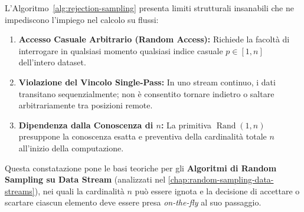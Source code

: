 \begin{property}
L'Algoritmo~\ref{alg:rejection-sampling} presenta limiti strutturali insanabili che ne impediscono l'impiego nel calcolo su flussi:
\begin{enumerate}
  \item \textbf{Accesso Casuale Arbitrario (Random Access):} Richiede la facoltà di interrogare in qualsiasi momento qualsiasi indice casuale $p \in [1, n]$ dell'intero dataset.
  \item \textbf{Violazione del Vincolo Single-Pass:} In uno stream continuo, i dati transitano sequenzialmente; non è consentito tornare indietro o saltare arbitrariamente tra posizioni remote.
  \item \textbf{Dipendenza dalla Conoscenza di $n$:} La primitiva $\operatorname{Rand}(1, n)$ presuppone la conoscenza esatta e preventiva della cardinalità totale $n$ all'inizio della computazione.
\end{enumerate}
\end{property}

Questa constatazione pone le basi teoriche per gli \textbf{Algoritmi di Random Sampling su Data Stream} (analizzati nel \autoref{chap:random-sampling-data-streams}), nei quali la cardinalità $n$ può essere ignota e la decisione di accettare o scartare ciascun elemento deve essere presa \emph{on-the-fly} al suo passaggio.
